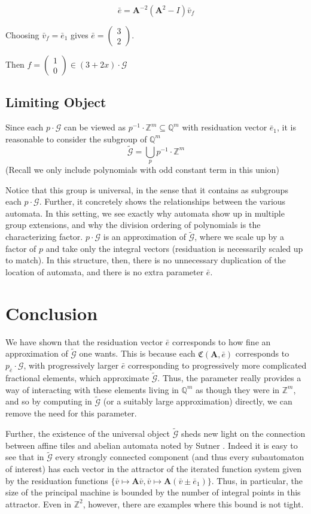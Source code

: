 \documentclass[runningheads]{llncs}
\newcommand{\G}{\mathcal{G}}
\newcommand{\C}{\mathfrak{C}(\Am,\e)}
\newcommand{\Z}{\mathbb{Z}}
\newcommand{\Q}{\mathbb{Q}}
\newcommand{\2}{\textbf{2}}
\newcommand{\Am}{\textbf{A}}
\newcommand{\vv}{\bar{v}}
\newcommand{\e}{\bar{e}}
\begin{document}
\[ \e = \Am^{-2} (\Am^2 - I) \vv_f \]

Choosing $\vv_f = \e_1$ gives $\e = \begin{pmatrix} 3 \\ 2 \end{pmatrix}$.

Then $f = \begin{pmatrix} 1 \\ 0 \end{pmatrix} \in (3+2x) \cdot \G$

\subsection{Limiting Object}
Since each $p \cdot \G$ can be viewed as $p^{-1} \cdot \Z^m \subseteq \Q^m$
with residuation vector $\e_1$,
it is reasonable to consider the subgroup of $\Q^m$
\[ 
  \widetilde{\G} = \bigcup_p p^{-1} \cdot \Z^m 
\]
(Recall we only include polynomials with odd constant term in this union)

Notice that this group is universal, in the sense that it contains as
subgroups each $p \cdot \G$. Further, it concretely shows the relationships
between the various automata. In this setting, we see exactly why automata 
show up in multiple group extensions, and why the division ordering of 
polynomials is the characterizing factor. $p \cdot \G$ is an approximation
of $\widetilde{\G}$, where we scale up by a factor of $p$ and take only
the integral vectors (residuation is necessarily scaled up to match). 
In this structure, then, there is no unnecessary duplication of the location
of automata, and there is no extra parameter $\e$.

\section{Conclusion}
We have shown that the residuation vector $\e$ corresponds to how fine an
approximation of $\widetilde{\G}$ one wants. This is because each $\C$ 
corresponds to $p_{\e} \cdot \G$, with progressively larger $\e$ 
corresponding to progressively more complicated fractional elements, which
approximate $\widetilde{\G}$. Thus, the parameter really provides a way of
interacting with these elements living in $\Q^m$ as though they were in $\Z^m$,
and so by computing in $\widetilde{\G}$ (or a suitably large approximation) 
directly, we can remove the need for this parameter.

Further, the existence of the universal object $\widetilde{\G}$ 
sheds new light on the connection between affine tiles%
\cite{LagariasWang96:tiles,LagariasWang97:integral_tiles}
and abelian automata noted by Sutner%
\cite{Sutner18:abelian_automata}. 
Indeed it is easy to see that in 
$\widetilde{\G}$ every strongly connected component 
(and thus every subautomaton of interest) has each vector in the attractor 
of the iterated function system given by the residuation functions 
$\{ \vv \mapsto \Am \vv, \vv \mapsto \Am (\vv \pm \e_1) \}$.
Thus, in particular, the size of the principal machine is bounded by the
number of integral points in this attractor. Even in $\Z^2$, however, there
are examples where this bound is not tight.
\end{document}
